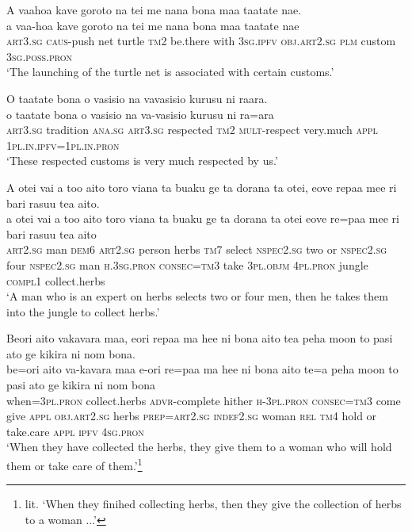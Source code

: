 \ea\label{ex:text21-1}
A vaahoa kave goroto na tei me nana bona maa taatate nae.\\
\gll a	vaa-hoa	kave	goroto	na	tei	me	nana	bona	maa	taatate	nae\\
     \textsc{art}3.\textsc{sg}	\textsc{caus}-push	net	turtle	\textsc{tm}2	be.there	with	3\textsc{sg}.\textsc{ipfv}	\textsc{obj}.\textsc{art}2.\textsc{sg}	\textsc{plm}	custom	3\textsc{sg}.\textsc{poss}.\textsc{pron}\\
\glt `The launching of the turtle net is associated with certain customs.'
\z

\ea\label{ex:text21-2}
O taatate bona o vasisio na vavasisio kurusu ni raara.\\
\gll o	taatate	bona	o	vasisio	na	va-vasisio	kurusu	ni	ra=ara\\
     \textsc{art}3.\textsc{sg}	tradition	\textsc{ana}.\textsc{sg}	\textsc{art}3.\textsc{sg}	respected	\textsc{tm}2	\textsc{mult}-respect	very.much	\textsc{appl}	1\textsc{pl}.\textsc{in}.\textsc{ipfv}=1\textsc{pl}.\textsc{in}.\textsc{pron}\\
\glt `These respected customs is very much respected by us.'
\z

\ea\label{ex:text21-3}
A otei vai a too aito toro viana ta buaku ge ta dorana ta otei, eove repaa mee ri bari rasuu tea aito.\\
\gll a	otei	vai	a	too	aito	toro	viana	ta	buaku	ge	ta	dorana	ta	otei	eove	re=paa	mee	ri	bari	rasuu	tea	aito\\
     \textsc{art}2.\textsc{sg}	man	\textsc{dem}6	\textsc{art}2.\textsc{sg}	person	herbs	\textsc{tm}7	select	\textsc{nspec}2.\textsc{sg}	two	or	\textsc{nspec}2.\textsc{sg}	four	\textsc{nspec}2.\textsc{sg}	man	\textsc{h}.3\textsc{sg}.\textsc{pron}	\textsc{consec}=\textsc{tm}3	take	3\textsc{pl}.\textsc{objm}	4\textsc{pl}.\textsc{pron}	jungle	\textsc{compl}1	collect.herbs\\
\glt `A man who is an expert on herbs selects two or four men, then he takes them into the jungle to collect herbs.'
\z

\ea\label{ex:text21-4}
Beori aito vakavara maa, eori repaa ma hee ni bona aito tea peha moon to pasi ato ge kikira ni nom bona.\\
\gll be=ori	aito	va-kavara	maa	e-ori	re=paa	ma	hee	ni	bona	aito	te=a	peha	moon	to	pasi	ato	ge	kikira	ni	nom	bona\\
     when=3\textsc{pl}.\textsc{pron}	collect.herbs	\textsc{advr}-complete	hither	\textsc{h}-3\textsc{pl}.\textsc{pron}	\textsc{consec}=\textsc{tm}3	come	give	\textsc{appl}	\textsc{obj}.\textsc{art}2.\textsc{sg}	herbs	\textsc{prep}=\textsc{art}2.\textsc{sg}	\textsc{indef}2.\textsc{sg}	woman	\textsc{rel}	\textsc{tm}4	hold	or	take.care	\textsc{appl}	\textsc{ipfv}	4\textsc{sg}.\textsc{pron}\\
\glt `When they have collected the herbs, they give them to a woman who will hold them or take care of them.'\footnote{lit. `When they finihed collecting herbs, then they give the collection of herbs to a woman ...'}
\z

